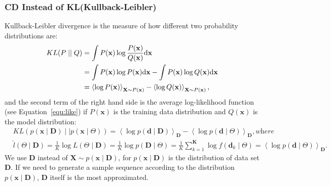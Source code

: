 \subsubsection{CD Instead of KL(Kullback-Leibler)}
\label{sec:CD}
Kullback-Leibler divergence is the measure of how different two probability distributions are:
\begin{equation}
\begin{aligned}
KL(P \mid \mid Q)
&= \int P(\mathbf{x}) \log \frac{P(\mathbf{x})}{Q(\mathbf{x})} \mathrm{d} \mathbf{x}\\
&= \int P(\mathbf{x}) \log P(\mathbf{x}) \mathrm{d} \mathbf{x} - \int P(\mathbf{x}) \log Q(\mathbf{x}) \mathrm{d} \mathbf{x}\\
&= \left \langle \log P(\mathbf{x}) \right \rangle_{\mathbf{X} \sim P(\mathbf{x})} - \left \langle \log Q(\mathbf{x}) \right \rangle_{\mathbf{X} \sim P(\mathbf{x})} ,
\end{aligned}
\end{equation}
and the second term of the right hand side is the average log-likelihood function (see Equation~\ref{equ:like}) if $P(\mathbf{x})$ is the training data distribution and $Q(\mathbf{x})$ is the model distribution:
\begin{equation}
\begin{aligned}
& KL \left( p(\mathbf{x} \mid \mathbf{D}) \mid \mid p(\mathbf{x} \mid \Theta) \right)
=   \left \langle \log p(\mathbf{d} \mid \mathbf{D}) \right \rangle_{\mathbf{D}} - \left \langle \log p(\mathbf{d} \mid \Theta) \right \rangle_{\mathbf{D}}, \textit{where} \\
& \hat{l} (\Theta \mid \mathbf{D}) =\frac{1}{K}\log  L (\Theta \mid \mathbf{D}) 
=  \frac{1}{K}\log p(\mathbf{D} \mid \Theta ) 
= \frac{1}{K} \sum_{k=1}^{\mathbf{K}} \log f(\mathbf{d}_k \mid \Theta )
= \left \langle \log p(\mathbf{d} \mid \Theta) \right \rangle_{\mathbf{D}}.
\end{aligned}
\end{equation}
We use $ \mathbf{D} $ instead of $ \mathbf{X} \sim p(\mathbf{x} \mid \mathbf{D}) $, for $ p(\mathbf{x} \mid \mathbf{D}) $ is the distribution of data set $ \mathbf{D} $.
If we need to generate a sample sequence according to the distribution $ p(\mathbf{x} \mid \mathbf{D}) $, $ \mathbf{D} $ itself is the most approximated.
